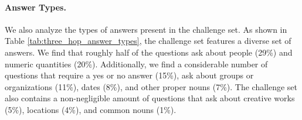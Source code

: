 \begin{table}
    \centering
\caption{Types of answers in Three+ Hop Challenge Set. 
These statistics are based on 100 randomly sampled examples.}
\label{tab:three_hop_answer_types}
\end{table} 

\paragraph{Answer Types.}
We also analyze the types of answers present in the challenge set.
As shown in Table \ref{tab:three_hop_answer_types}, the challenge set features a diverse set of answers. 
We find that roughly half of the questions ask about people (29\%) and numeric quantities (20\%).  
Additionally, we find a considerable number of questions that require a yes or no answer (15\%), ask about groups or organizations (11\%), dates (8\%), and other proper nouns (7\%). The challenge set also contains a non-negligible amount of questions that ask about creative works (5\%), locations (4\%), and common nouns (1\%).

